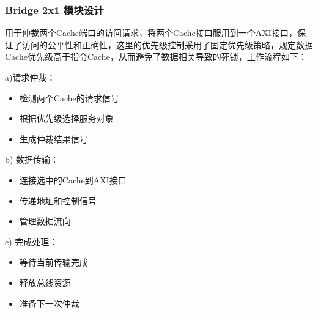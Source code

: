 \begin{flushleft}
\subsubsection{Bridge 2x1 模块设计}
用于仲裁两个Cache端口的访问请求，将两个Cache接口服用到一个AXI接口，保证了访问的公平性和正确性，这里的优先级控制采用了固定优先级策略，规定数据Cache优先级高于指令Cache，从而避免了数据相关导致的死锁，工作流程如下：
\end{flushleft}
\begin{flushleft}
a)请求仲裁：
\begin{itemize}
\item 检测两个Cache的请求信号
\item 根据优先级选择服务对象
\item 生成仲裁结果信号
\end{itemize}

b) 数据传输：
\begin{itemize}
\item 连接选中的Cache到AXI接口
\item 传递地址和控制信号
\item 管理数据流向
\end{itemize}

c) 完成处理：
\begin{itemize}
\item 等待当前传输完成
\item 释放总线资源
\item 准备下一次仲裁
\end{itemize}
\end{flushleft}

